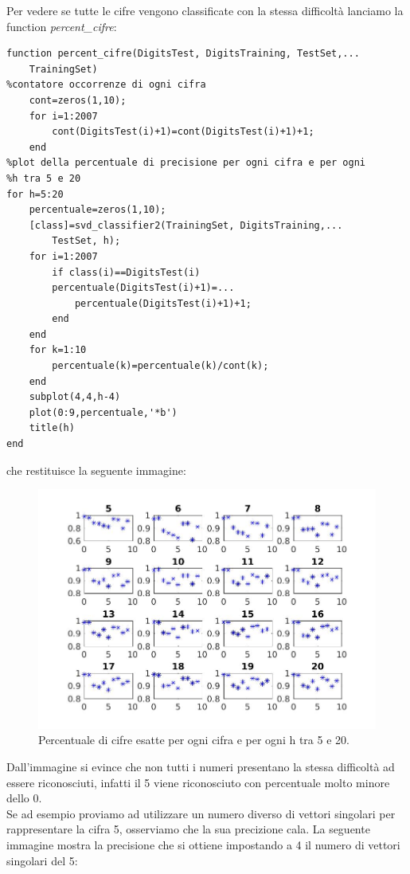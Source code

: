 \documentclass[11pt,a4paper,twoside,openright,titlepage,
                           headinclude,footinclude,BCOR5mm,
                           numbers=noenddot,cleardoublepage=empty,
                           tablecaptionabove]{scrbook}
\begin{document}
\newpage
Per vedere se tutte le cifre vengono classificate con la stessa difficoltà lanciamo la function \emph{percent\_cifre}:
\begin{lstlisting}[frame=trBL]
function percent_cifre(DigitsTest, DigitsTraining, TestSet,...
    TrainingSet)
%contatore occorrenze di ogni cifra
    cont=zeros(1,10);
    for i=1:2007
        cont(DigitsTest(i)+1)=cont(DigitsTest(i)+1)+1;
    end
%plot della percentuale di precisione per ogni cifra e per ogni
%h tra 5 e 20
for h=5:20
    percentuale=zeros(1,10);
    [class]=svd_classifier2(TrainingSet, DigitsTraining,...
        TestSet, h);
    for i=1:2007
        if class(i)==DigitsTest(i)
        percentuale(DigitsTest(i)+1)=...
            percentuale(DigitsTest(i)+1)+1;
        end
    end
    for k=1:10
        percentuale(k)=percentuale(k)/cont(k);
    end
    subplot(4,4,h-4)
    plot(0:9,percentuale,'*b')
    title(h)
end
\end{lstlisting}
\par
che restituisce la seguente immagine:

\begin{figure}[h!]
\begin{center}
\includegraphics[width=\textwidth]{figs/percent_cifre.jpg}
\caption{Percentuale di cifre esatte per ogni cifra e per ogni h tra 5 e 20.}
\end{center}
\end{figure}

Dall'immagine si evince che non tutti i numeri presentano la stessa difficoltà ad essere riconosciuti, infatti il 5 viene riconosciuto con percentuale molto minore dello 0.\\
Se ad esempio proviamo ad utilizzare un numero diverso di vettori singolari per rappresentare la cifra 5, osserviamo che la sua precizione cala. La seguente immagine mostra la precisione che si ottiene impostando a 4 il numero di vettori singolari del 5:
\end{document}
